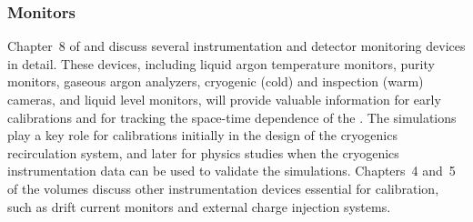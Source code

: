 \subsubsection{Monitors} 
Chapter~8 of \voltitlesp{} and \voltitledp{} discuss several instrumentation and detector monitoring devices in detail. These devices, including liquid argon temperature monitors, \lar purity monitors, gaseous argon analyzers, cryogenic (cold) and inspection (warm) cameras, and liquid level monitors, will provide valuable information for early calibrations and for tracking the space-time dependence of the . 
The  simulations play a key role for calibrations initially in the design of the cryogenics recirculation system, and later for physics studies when the cryogenics instrumentation data can be used to validate the simulations. Chapters~4 and~5 of the  volumes discuss other instrumentation devices essential for calibration, such as drift  current monitors and external charge injection systems. 

